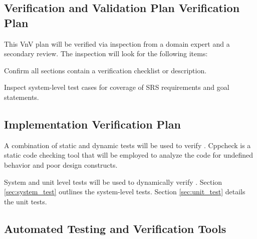 \documentclass[12pt, titlepage]{article}
\begin{document}

\subsection{Verification and Validation Plan Verification Plan}

This VnV plan will be verified via inspection from a domain expert and a secondary review. The
inspection will look for the following items:
\begin{todolist}
    \item Confirm all sections contain a verification checklist or description.
    \item Inspect system-level test cases for coverage of SRS requirements and goal statements.
\end{todolist}


\subsection{Implementation Verification Plan}

A combination of static and dynamic tests will be used to verify \progname{}. Cppcheck \citep{cppcheck} is a static code checking tool that will be employed to analyze the code for undefined behavior and poor design constructs.

System and unit level tests will be used to dynamically verify \progname{}. Section \ref{sec:system_test} outlines the system-level tests. Section \ref{sec:unit_test} details the unit tests.


\subsection{Automated Testing and Verification Tools}
\end{document}
